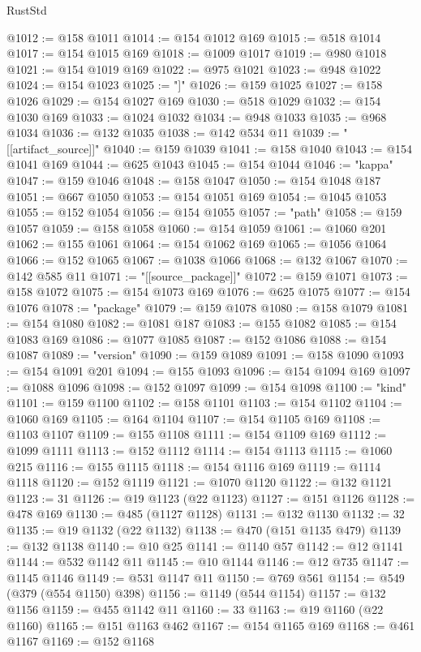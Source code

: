 \begin{lexlean}{RustStd}
\begin{coremodule}
{\begin{coremodule}
{{{{{{{{{{{{{{{{{{{{{{{{{{{{{{{{{{{{{{{{{{{{{{{{{{{{{{{{{{{{{{{{{{{{{{{{{{{{{{{{@1012 := @158 @1011
@1014 := @154 @1012 @169
@1015 := @518 @1014
@1017 := @154 @1015 @169
@1018 := @1009 @1017
@1019 := @980 @1018
@1021 := @154 @1019 @169
@1022 := @975 @1021
@1023 := @948 @1022
@1024 := @154 @1023
@1025 := "]"
@1026 := @159 @1025
@1027 := @158 @1026
@1029 := @154 @1027 @169
@1030 := @518 @1029
@1032 := @154 @1030 @169
@1033 := @1024 @1032
@1034 := @948 @1033
@1035 := @968 @1034
@1036 := @132 @1035
@1038 := @142 @534 @11
@1039 := "[[artifact_source]]"
@1040 := @159 @1039
@1041 := @158 @1040
@1043 := @154 @1041 @169
@1044 := @625 @1043
@1045 := @154 @1044
@1046 := "kappa"
@1047 := @159 @1046
@1048 := @158 @1047
@1050 := @154 @1048 @187
@1051 := @667 @1050
@1053 := @154 @1051 @169
@1054 := @1045 @1053
@1055 := @152 @1054
@1056 := @154 @1055
@1057 := "path"
@1058 := @159 @1057
@1059 := @158 @1058
@1060 := @154 @1059
@1061 := @1060 @201
@1062 := @155 @1061
@1064 := @154 @1062 @169
@1065 := @1056 @1064
@1066 := @152 @1065
@1067 := @1038 @1066
@1068 := @132 @1067
@1070 := @142 @585 @11
@1071 := "[[source_package]]"
@1072 := @159 @1071
@1073 := @158 @1072
@1075 := @154 @1073 @169
@1076 := @625 @1075
@1077 := @154 @1076
@1078 := "package"
@1079 := @159 @1078
@1080 := @158 @1079
@1081 := @154 @1080
@1082 := @1081 @187
@1083 := @155 @1082
@1085 := @154 @1083 @169
@1086 := @1077 @1085
@1087 := @152 @1086
@1088 := @154 @1087
@1089 := "version"
@1090 := @159 @1089
@1091 := @158 @1090
@1093 := @154 @1091 @201
@1094 := @155 @1093
@1096 := @154 @1094 @169
@1097 := @1088 @1096
@1098 := @152 @1097
@1099 := @154 @1098
@1100 := "kind"
@1101 := @159 @1100
@1102 := @158 @1101
@1103 := @154 @1102
@1104 := @1060 @169
@1105 := @164 @1104
@1107 := @154 @1105 @169
@1108 := @1103 @1107
@1109 := @155 @1108
@1111 := @154 @1109 @169
@1112 := @1099 @1111
@1113 := @152 @1112
@1114 := @154 @1113
@1115 := @1060 @215
@1116 := @155 @1115
@1118 := @154 @1116 @169
@1119 := @1114 @1118
@1120 := @152 @1119
@1121 := @1070 @1120
@1122 := @132 @1121
@1123 := 31
@1126 := @19 @1123 (@22 @1123)
@1127 := @151 @1126
@1128 := @478 @169
@1130 := @485 (@1127 @1128)
@1131 := @132 @1130
@1132 := 32
@1135 := @19 @1132 (@22 @1132)
@1138 := @470 (@151 @1135 @479)
@1139 := @132 @1138
@1140 := @10 @25
@1141 := @1140 @57
@1142 := @12 @1141
@1144 := @532 @1142 @11
@1145 := @10 @1144
@1146 := @12 @735
@1147 := @1145 @1146
@1149 := @531 @1147 @11
@1150 := @769 @561
@1154 := @549 (@379 (@554 @1150) @398)
@1156 := @1149 (@544 @1154)
@1157 := @132 @1156
@1159 := @455 @1142 @11
@1160 := 33
@1163 := @19 @1160 (@22 @1160)
@1165 := @151 @1163 @462
@1167 := @154 @1165 @169
@1168 := @461 @1167
@1169 := @152 @1168
}}}}}}}}}}}}}}}}}}}}}}}}}}}}}}}}}}}}}}}}}}}}}}}}}}}}}}}}}}}}}}}}}}}}}}}}}}}}}}}}
\end{coremodule}}
\end{coremodule}
\end{lexlean}
